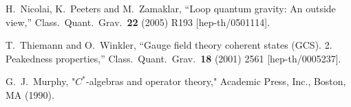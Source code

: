 \documentclass[12pt]{article}
\begin{document}
\begin{thebibliography}{99}
  H.~Nicolai, K.~Peeters and M.~Zamaklar,
  ``Loop quantum gravity: An outside view,''
  Class.\ Quant.\ Grav.\  {\bf 22} (2005) R193
  [hep-th/0501114].





  T.~Thiemann and O.~Winkler,
  ``Gauge field theory coherent states (GCS). 2. Peakedness properties,''
  Class.\ Quant.\ Grav.\  {\bf 18} (2001) 2561
  [hep-th/0005237].


   G.~J.~Murphy,
   "$C^*$-algebras and operator theory,"
   Academic Press, Inc., Boston, MA (1990).



\end{thebibliography}
\end{document}

